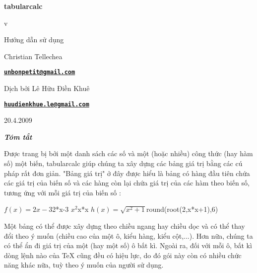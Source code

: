 \documentclass[a4paper,10pt]{article}
\newcommand\tbcalc{\textsf{tabularcalc}\xspace}
\begin{document}
\setlength{\parindent}{0pt}
\begin{titlepage}
	\null\par\vfill
	\begin{center}
		\begin{minipage}{0.75\linewidth}
			\begin{center}
				\Huge\bfseries \tbcalc\par\vspace{5pt}
				\small v\tabularcalcversion\par\vspace{25pt}
				\normalsize Hướng dẫn sử dụng
			\end{center}
		\end{minipage}
	\end{center}
	\vspace{1cm}
	\begin{center}
		Christian {\sc Tellechea}\par\small
		\href{mailto:unbonpetit@gmail.com}{\texttt{\textbf{unbonpetit@gmail.com}}}\par\vspace{5pt}
		Dịch bởi Lê Hữu Điền Khuê\par\small
        \href{mailto:huudienkhue.le@gmail.com}{\texttt{\textbf{huudienkhue.le@gmail.com}}}\par\vspace{5pt}
       20.4.2009
	\end{center}
	\vfill\hrulefill
	\begin{center}
		\begin{minipage}{0.85\linewidth}
			\noindent
			\hfill\textbf{\textit{Tóm tắt}}\hfill{}\medskip\par
				Được trang bị bởi một danh sách các số và một (hoặc nhiều) công thức (hay hàm số) một biến, \tbcalc giúp chúng ta xây dựng các bảng giá trị bằng các cú pháp rất đơn giản. "Bảng giá trị" ở đây được hiểu là bảng có hàng đầu tiên chứa các giá trị của biến số và các hàng còn lại chứa giá trị của các hàm theo biến số, tương ứng với mỗi giá trị của biến số :
				\begin{center}
					\tcsethrule{\hline}{\hline\hline}{\hline}
					              {$f(x)=2x-3$}{2*x-3}
					              {$x^2$}{x*x}
					              {$h(x)=\sqrt{x^2+1}$}{round(root(2,x*x+1),6)}
				\end{center}
				Một bảng có thể được xây dựng theo chiều ngang hay chiều dọc và có thể thay đổi theo ý muốn (chiều cao của một ô, kiểu hàng, kiểu cột,...). Hơn nữa, chúng ta có thể ẩn đi giá trị của một (hay một số) ô bất kì. Ngoài ra, đối với mỗi ô, bất kì dòng lệnh nào của \TeX{} cũng đều có hiệu lực, do đó gói này còn có nhiều chức năng khác nữa, tuỳ theo ý muốn của người sử dụng.  
\smallskip
		\end{minipage}
	\end{center}
	\hrulefill\vfill{}
\end{titlepage}
\end{document}
